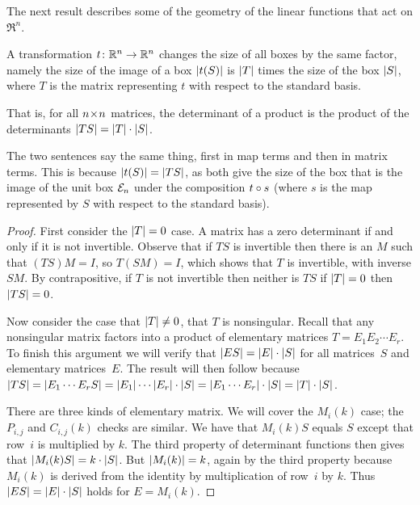 The next result describes some of the geometry of the linear
functions that act on
\( \Re^n \). 

\begin{theorem}
\label{th:MatChVolByDetMat}
A transformation \( \mbox{$t\colon \mathbb{R}^n\to \mathbb{R}^n$} \) changes the size of all boxes
by the same factor, namely the size of the image of a box
$\deter{t(S)}$ is $\deter{T}$ times the size of the box $\deter{S}$,
where $T$ is the matrix
representing $t$ with respect to the standard basis.

That is, for all $n \! \times \! n$ matrices, the determinant of a product is the
product of the determinants $\deter{TS}=\deter{T}\cdot\deter{S}$.
\end{theorem}

The two sentences say the same thing, first in map terms and then
in matrix terms. 
This is because
$\deter{t(S)}=\deter{TS}$, as both give the size of the box that is the
image of the unit box ${\cal E}_n$ under the composition $t\mathbin\circ s$
(where $s$ is the map represented by $S$ with respect to the standard basis).


\begin{proof}
First consider the $\deter{T}=0$ case.
A matrix has a zero determinant if and only if it is not invertible.
Observe that if \( TS \) is invertible then there
is an $M$ such that \( (TS)M=I \), so 
\( T(SM)=I \), which shows that \( T \) is invertible, with inverse $SM$.
By contrapositive, 
if \( T \) is not invertible then neither is \( TS \) \Dash 
if $\deter{T}=0$ then $\deter{TS}=0$.

Now consider the case that $\deter{T}\neq 0$, that $T$ is nonsingular. 
Recall that any nonsingular matrix factors into a product 
of elementary matrices $T=E_1E_2\cdots E_r$.
To finish this argument 
we will verify that 
\( \deter{ES}=\deter{E}\cdot\deter{S} \)
for all matrices~$S$ and elementary matrices~$E$. 
The result will then follow because 
$\deter{TS}=\deter{E_1\cdots E_rS}=\deter{E_1}\cdots\deter{E_r}\cdot\deter{S}
  =\deter{E_1\cdots E_r}\cdot\deter{S}=\deter{T}\cdot\deter{S}$.

There are three kinds of elementary matrix. 
We will cover the $M_i(k)$ case; 
the $P_{i,j}$ and $C_{i,j}(k)$ checks are similar.
We have that $M_i(k)S$ equals $S$ except that row~$i$ is multiplied by $k$.
The third property of determinant functions
then gives that $\deter{M_i(k)S}=k\cdot\deter{S}$.
But $\deter{M_i(k)}=k$, again by the third property because
$M_i(k)$ is derived from the identity by multiplication of row~$i$ by
$k$. 
Thus \( \deter{ES}=\deter{E}\cdot\deter{S} \) holds for
$E=M_i(k)$.
\end{proof}


